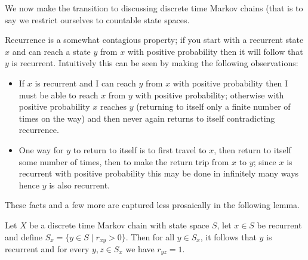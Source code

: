 We now make the transition to discussing discrete time Markov chains
(that is to say we restrict ourselves to countable state spaces.

Recurrence is a somewhat contagious property; if you start with a
recurrent state $x$ and can reach a state $y$ from $x$ with positive
probability then it will follow that $y$ is recurrent.  Intuitively
this can be seen by making the following observations:
\begin{itemize}
\item If $x$ is recurrent and I can reach $y$ from $x$ with positive
  probability then I must be able to reach $x$ from $y$ with positive
  probability; otherwise with positive probability $x$ reaches $y$
  (returning to itself only a finite number of times on the way) and
  then never again returns to itself contradicting recurrence.
\item One way for $y$ to return to itself is to first travel to $x$,
  then return to itself some number of times, then to make the return
  trip from $x$ to $y$; since $x$ is recurrent with positive
  probability this may be done in infinitely many ways hence $y$ is
  also recurrent.
\end{itemize}
These facts and a few more are captured less prosaically in the
following lemma.
\begin{lem}\label{RecurrenceClassesMarkovChains}Let $X$ be a discrete
  time Markov chain with state space $S$, let $x \in S$ be recurrent
  and define $S_x = \lbrace y \in S \mid r_{xy} > 0 \rbrace$.  Then
  for all $y \in S_x$, it follows that $y$ is recurrent
and for every $y,z \in S_x$ we have $r_{yz} = 1$.
\end{lem}
